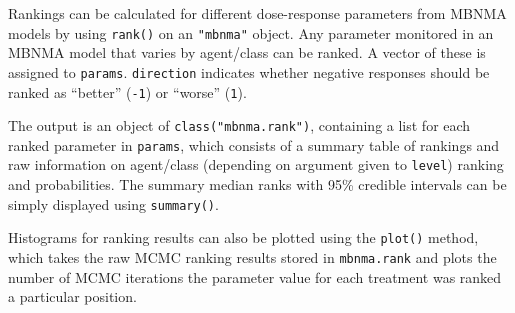 \documentclass[]{article}
\newenvironment{Shaded}{\begin{snugshade}}{\end{snugshade}}
\newcommand{\CommentTok}[1]{\textcolor[rgb]{0.56,0.35,0.01}{\textit{#1}}}
\newcommand{\DataTypeTok}[1]{\textcolor[rgb]{0.13,0.29,0.53}{#1}}
\newcommand{\DecValTok}[1]{\textcolor[rgb]{0.00,0.00,0.81}{#1}}
\newcommand{\KeywordTok}[1]{\textcolor[rgb]{0.13,0.29,0.53}{\textbf{#1}}}
\newcommand{\NormalTok}[1]{#1}
\newcommand{\StringTok}[1]{\textcolor[rgb]{0.31,0.60,0.02}{#1}}
\begin{document}
Rankings can be calculated for different dose-response parameters from
MBNMA models by using \texttt{rank()} on an \texttt{"mbnma"} object. Any
parameter monitored in an MBNMA model that varies by agent/class can be
ranked. A vector of these is assigned to \texttt{params}.
\texttt{direction} indicates whether negative responses should be ranked
as ``better'' (\texttt{-1}) or ``worse'' (\texttt{1}).

\begin{Shaded}
\end{Shaded}

The output is an object of \texttt{class("mbnma.rank")}, containing a
list for each ranked parameter in \texttt{params}, which consists of a
summary table of rankings and raw information on agent/class (depending
on argument given to \texttt{level}) ranking and probabilities. The
summary median ranks with 95\% credible intervals can be simply
displayed using \texttt{summary()}.

Histograms for ranking results can also be plotted using the
\texttt{plot()} method, which takes the raw MCMC ranking results stored
in \texttt{mbnma.rank} and plots the number of MCMC iterations the
parameter value for each treatment was ranked a particular position.
\end{document}
